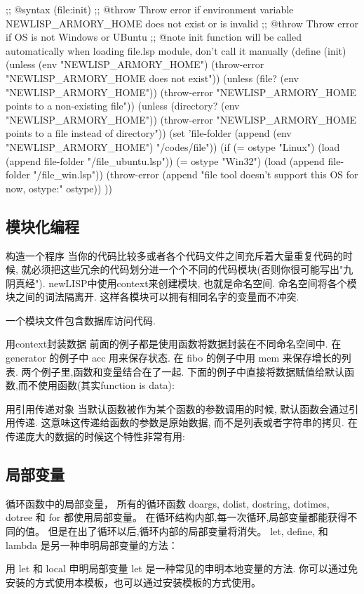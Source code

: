\documentclass[cn,11pt]{elegantbook}
\begin{document}
;; @syntax (file:init)
;; @throw Throw error if environment variable NEWLISP_ARMORY_HOME does not exist or is invalid
;; @throw Throw error if OS is not Windows or UBuntu
;; @note init function will be called automatically when loading file.lsp module, don't call it manually
(define (init)
  (unless (env "NEWLISP_ARMORY_HOME")
	  (throw-error "NEWLISP_ARMORY_HOME does not exist"))
  (unless (file? (env "NEWLISP_ARMORY_HOME"))
	  (throw-error "NEWLISP_ARMORY_HOME points to a non-existing file"))
  (unless (directory? (env "NEWLISP_ARMORY_HOME"))
	  (throw-error "NEWLISP_ARMORY_HOME points to a file instead of directory"))
  (set 'file-folder (append (env "NEWLISP_ARMORY_HOME") "/codes/file"))
  (if
   (= ostype "Linux") (load (append file-folder "/file_ubuntu.lsp"))
   (= ostype "Win32") (load (append file-folder "/file_win.lsp"))
   (throw-error (append "file tool doesn't support this OS for now, ostype:" ostype))
   ))

   \subsection{模块化编程}
   构造一个程序 当你的代码比较多或者各个代码文件之间充斥着大量重复代码的时候,
   就必须把这些冗余的代码划分进一个个不同的代码模块(否则你很可能写出"九阴真经").
   newLISP中使用context来创建模块, 也就是命名空间. 命名空间将各个模块之间的词法隔离开.
   这样各模块可以拥有相同名字的变量而不冲突.

一个模块文件包含数据库访问代码.

用context封装数据
前面的例子都是使用函数将数据封装在不同命名空间中. 在 generator 的例子中 acc 用来保存状态. 在 fibo 的例子中用 mem 来保存增长的列表. 两个例子里,函数和变量结合在了一起. 下面的例子中直接将数据赋值给默认函数,而不使用函数(其实function is data):

用引用传递对象
当默认函数被作为某个函数的参数调用的时候, 默认函数会通过引用传递. 这意味这传递给函数的参数是原始数据, 而不是列表或者字符串的拷贝. 在传递庞大的数据的时候这个特性非常有用:

\subsection{局部变量}
循环函数中的局部变量，
所有的循环函数 doargs, dolist, dostring, dotimes, dotree 和 for 都使用局部变量。 在循环结构内部,每一次循环,局部变量都能获得不同的值。
但是在出了循环以后,循环内部的局部变量将消失。
let, define, 和 lambda 是另一种申明局部变量的方法：

用 let 和 local 申明局部变量
let 是一种常见的申明本地变量的方法.
你可以通过免安装的方式使用本模板，也可以通过安装模板的方式使用。
\end{document}
